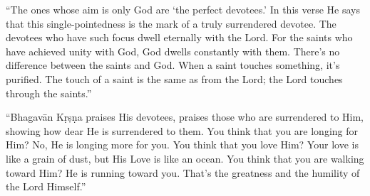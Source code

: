 \enquote{The ones whose aim is only God are \enquote{the perfect devotees.} In this verse He says that this single-pointedness is the mark of a truly surrendered devotee. The devotees who have such focus dwell eternally with the Lord. For the saints who have achieved unity with God, God dwells constantly with them. There’s no difference between the saints and God. When a saint touches something, it’s purified. The touch of a saint is the same as from the Lord; the Lord touches through the saints.}

\enquote{Bhagavān Kṛṣṇa praises His devotees, praises those who are surrendered to Him, showing how dear He is surrendered to them. You think that you are longing for Him? No, He is longing more for you. You think that you love Him? Your love is like a grain of dust, but His Love is like an ocean. You think that you are walking toward Him? He is running toward you. That’s the greatness and the humility of the Lord Himself.}